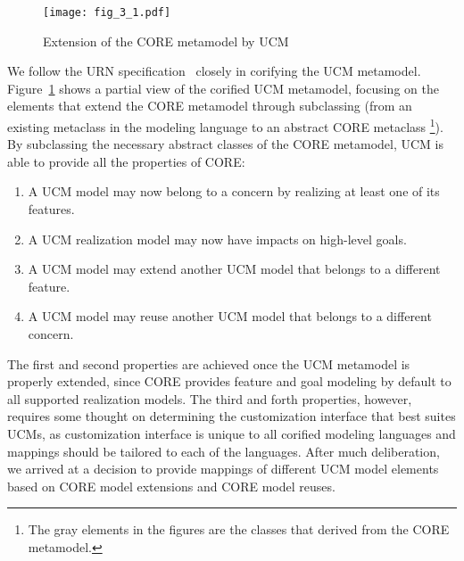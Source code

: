 \begin{figure}
	\centering
	\texttt{[image: fig\_3\_1.pdf]}
	\caption{Extension of the CORE metamodel by UCM}
	\label{fig:3.1}
\end{figure}

We follow the URN specification~\cite{itu2012151} closely in corifying the UCM metamodel. Figure~\ref{fig:3.1} shows a partial view of the corified UCM metamodel, focusing on the elements that extend the CORE metamodel through subclassing (from an existing metaclass in the modeling language to an abstract CORE metaclass \footnote{The gray elements in the figures are the classes that derived from the CORE metamodel.}). By subclassing the necessary abstract classes of the CORE metamodel, UCM is able to provide all the properties of CORE:

\begin{enumerate}
	\setlength{\parskip}{0pt} \setlength{\itemsep}{0pt}
	\item A UCM model may now belong to a concern by realizing at least one of its features.
	\item A UCM realization model may now have impacts on high-level goals.
	\item A UCM model may extend another UCM model that belongs to a different feature.
	\item A UCM model may reuse another UCM model that belongs to a different concern.
\end{enumerate}

The first and second properties are achieved once the UCM metamodel is properly extended, since CORE provides feature and goal modeling by default to all supported realization models. The third and forth properties, however, requires some thought on determining the customization interface that best suites UCMs, as customization interface is unique to all corified modeling languages and mappings should be tailored to each of the languages. After much deliberation, we arrived at a decision to provide mappings of different UCM model elements based on CORE model extensions and CORE model reuses.

